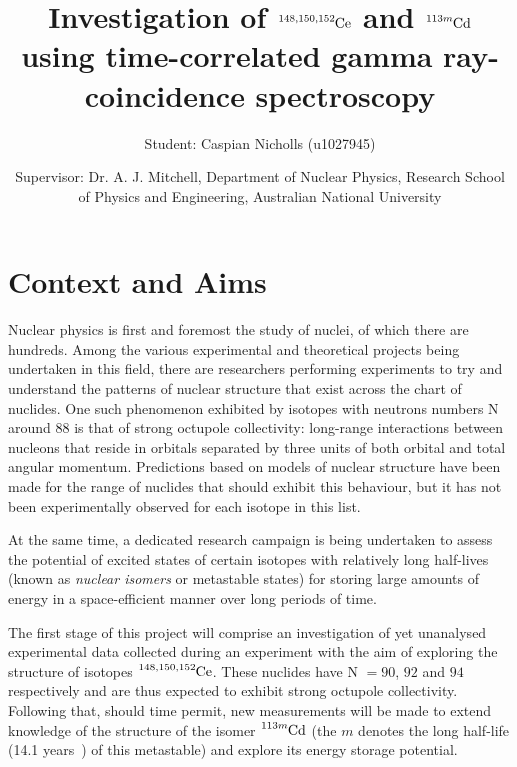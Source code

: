 \documentclass[12pt,a4paper]{article}
\begin{document}
\title{Investigation of $\ce{^{148,150,152}Ce}$ and $\ce{^{113m}Cd}$ using time-correlated gamma ray-coincidence spectroscopy}
\author{Student: Caspian Nicholls (u1027945)}
\date{Supervisor: Dr. A. J. Mitchell, Department of Nuclear Physics, Research School of Physics and Engineering, Australian National University}

\maketitle
\section*{Context and Aims}
\medskip
Nuclear physics is first and foremost the study of nuclei, of which there are hundreds. Among the various experimental and theoretical projects being undertaken in this field, there are researchers performing experiments to try and understand the patterns of nuclear structure that exist across the chart of nuclides. One such phenomenon exhibited by isotopes with neutrons numbers N around 88 is that of strong octupole collectivity: long-range interactions between nucleons that reside in orbitals separated by three units of both orbital and total angular momentum. Predictions based on models of nuclear structure have been made for the range of nuclides that should exhibit this behaviour, but it has not been experimentally observed for each isotope in this list.

\medskip
At the same time, a dedicated research campaign is being undertaken to assess the potential of excited states of certain isotopes with relatively long half-lives (known as \textit{nuclear isomers} or metastable states) for storing large amounts of energy in a space-efficient manner over long periods of time. 

\medskip
The first stage of this project will comprise an investigation of yet unanalysed experimental data collected during an experiment with the aim of exploring the structure of isotopes $\ce{^{148,150,152}Ce}$. These nuclides have N $ = 90$, $92$ and $94$ respectively and are thus expected to exhibit strong octupole collectivity. Following that, should time permit, new measurements will be made to extend knowledge of the structure of the isomer $\ce{^{113m}Cd}$ (the $m$ denotes the long half-life (14.1 years~\cite{shaffer_innovations_2018}) of this metastable) and explore its energy storage potential. 
\end{document}

